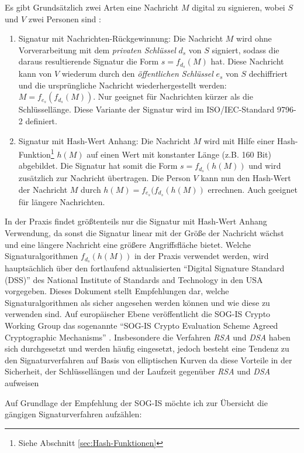 \documentclass[11pt,a4paper,ngerman]{scrreprt}
\begin{document}
Es gibt Grundsätzlich zwei Arten eine Nachricht $M$ digital zu signieren, wobei $S$ und $V$ zwei Personen sind \cite[S. 28-29]{kryptSec11}:
\begin{enumerate}
    \item Signatur mit Nachrichten-Rückgewinnung: Die Nachricht $M$ wird ohne Vorverarbeitung mit dem \emph{privaten Schlüssel} $d_s$ von $S$ signiert, sodass die daraus resultierende Signatur die Form $s = f_{d_s}(M)$ hat. Diese Nachricht kann von $V$ wiederum durch den \emph{öffentlichen Schlüssel} $e_s$ von $S$ dechiffriert und die ursprüngliche Nachricht wiederhergestellt werden: $M = f_{e_s}(f_{d_s}(M))$. Nur geeignet für Nachrichten kürzer als die Schlüssellänge. Diese Variante der Signatur wird im ISO/IEC-Standard 9796-2 definiert.
    \item Signatur mit Hash-Wert Anhang: Die Nachricht $M$ wird mit Hilfe einer Hash-Funktion\footnote{Siehe Abschnitt \ref{sec:Hash-Funktionen}} $h(M)$ auf einen Wert mit konstanter Länge (z.B. 160 Bit) abgebildet. Die Signatur hat somit die Form $s = f_{d_s}(h(M))$ und wird zusätzlich zur Nachricht übertragen. Die Person $V$ kann nun den Hash-Wert der Nachricht $M$ durch $h(M) = f_{e_s}(f_{d_s}(h(M))$ errechnen. Auch geeignet für längere Nachrichten.
\end{enumerate}
In der Praxis findet größtenteils nur die Signatur mit Hash-Wert Anhang Verwendung, da sonst die Signatur linear mit der Größe der Nachricht wächst und eine längere Nachricht eine größere Angriffsfläche bietet. Welche Signaturalgorithmen $f_{d_s}(h(M))$ in der Praxis verwendet werden, wird hauptsächlich über den fortlaufend aktualisierten ``Digital Signature Standard (DSS)'' des National Institute of Standards and Technology in den USA vorgegeben. Dieses Dokument stellt Empfehlungen dar, welche Signaturalgorithmen als sicher angesehen werden können und wie diese zu verwenden sind. Auf europäischer Ebene veröffentlicht die SOG-IS Crypto Working Group das sogenannte ``SOG-IS Crypto Evaluation Scheme Agreed Cryptographic Mechanisms'' \cite{sogisACM}. Insbesondere die Verfahren \textit{RSA} und \textit{DSA} haben sich durchgesetzt und werden häufig eingesetzt, jedoch besteht eine Tendenz zu den Signaturverfahren auf Basis von elliptischen Kurven da diese Vorteile in der Sicherheit, der Schlüssellängen und der Laufzeit gegenüber \textit{RSA} und \textit{DSA} aufweisen \cite[S. 59]{komSec13}

Auf Grundlage der Empfehlung der SOG-IS möchte ich zur Übersicht die gängigen Signaturverfahren aufzählen:
\end{document}
